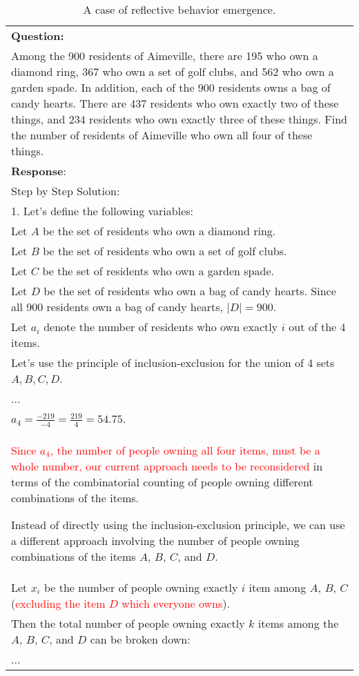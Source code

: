 \begin{table}[h]
    \centering
    \begin{tabular}{@{}p{}@{}} 
        \toprule 
        \textbf{Question:} \\
        Among the 900 residents of Aimeville, there are 195 who own a diamond ring, 367 who own a set of golf clubs, and 562 who own a garden spade. In addition, each of the 900 residents owns a bag of candy hearts. There are 437 residents who own exactly two of these things, and 234 residents who own exactly three of these things. Find the number of residents of Aimeville who own all four of these things. \\
        \midrule 
        \textbf{Response}: \\
        Step by Step Solution: \\
        1. Let's define the following variables: \\
        Let $A$ be the set of residents who own a diamond ring. \\
        Let $B$ be the set of residents who own a set of golf clubs. \\
        Let $C$ be the set of residents who own a garden spade. \\
        Let $D$ be the set of residents who own a bag of candy hearts. Since all 900 residents own a bag of candy hearts, $|D| = 900$. \\
        Let $a_{i}$ denote the number of residents who own exactly $i$ out of the 4 items. \\
        Let's use the principle of inclusion-exclusion for the union of 4 sets $A, B, C, D$. \\
        ... \\
        $a_4 = \frac{- 219}{- 4} = \frac{219}{4} = 54.75$. \\
        \textcolor{red}{Since $a_4$, the number of people owning all four items, must be a whole number, our current approach needs to be reconsidered} in terms of the combinatorial counting of people owning different combinations of the items.

        Instead of directly using the inclusion-exclusion principle, we can use a different approach involving the number of people owning combinations of the items $A$, $B$, $C$, and $D$. \\
        Let $x_i$ be the number of people owning exactly $i$ item among $A$, $B$, $C$ (\textcolor{red}{excluding the item $D$ which everyone owns}). \\
        Then the total number of people owning exactly $k$ items among the $A$, $B$, $C$, and $D$ can be broken down: \\
        ... \\
        \bottomrule 
    \end{tabular}
    \caption{A case of reflective behavior emergence.}
    \label{tab:case_study2}
\end{table}